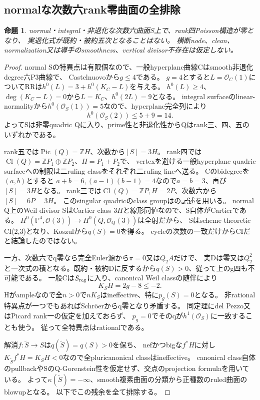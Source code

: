 \documentclass[a4paper,11pt]{ltjsarticle}
\newtheorem{proposition}{命題}[section]
\theoremstyle{definition}
\begin{document}
\subsection{normalな次数六rank零曲面の全排除}
\begin{proposition}\label{prop:normal-degree-six-rank-zero}
normal・integral・非退化な次数六曲面S上で、rank四Poisson構造が零となり、
実退化式が既約・被約五次となることはない。
横断node、clean、normalization又は導手のsmoothness、vertical divisor不存在は仮定しない。
\end{proposition}
\begin{proof}
normal Sの特異点は有限個なので、一般hyperplane曲線Cはsmooth非退化degree六P3曲線で、
Castelnuovoから$g\le4$である。
$g=4$とすると$L=\mathcal O_C(1)$についてRRは$h^0(L)=3+h^0(K_C-L)$を与える。
$h^0(L)\ge4$、$\deg(K_C-L)=0$から$L=K_C$、$h^0(2L)=9$となる。
integral surfaceのlinear-normalityから$h^0(\mathcal O_S(1))=5$なので、hyperplane完全列により
\[
 h^0(\mathcal O_S(2))\le5+9=14.
\]
よってSは非零quadric Qに入り、prime性と非退化性からQはrank三、四、五のいずれかである。

rank五では$\operatorname{Pic}(Q)=\mathbb ZH$、次数から$[S]=3H$。
rank四では$\operatorname{Cl}(Q)=\mathbb ZP_1\oplus\mathbb ZP_2$、$H=P_1+P_2$で、
vertexを避ける一般hyperplane quadric surfaceへの制限は二ruling classをそれぞれ二ruling lineへ送る。
Cのbidegreeを$(a,b)$とすると
$a+b=6,(a-1)(b-1)=4$なので$a=b=3$、再び$[S]=3H$となる。
rank三では$\operatorname{Cl}(Q)=\mathbb ZP,H=2P$、次数六から$[S]=6P=3H$。
このsingular quadricのclass groupは\cite[p.5]{tironi5}の記述を用いる。
normal Q上のWeil divisor SはCartier class $3H$と線形同値なので、S自体がCartierである。
$H^0(\mathbb P^4,\mathcal O(3))\to H^0(Q,\mathcal O_Q(3))$は全射だから、
Sはscheme-theoretic CI(2,3)となり、Koszulから$q(S)=0$を得る。
cycleの次数の一致だけからCIだと結論したのではない。

一方、次数六でq零なら完全Euler源から$\pi=0$又は$Q_2A$だけで、
実Dは零又は$Q_2^2$と一次式の積となる。既約・被約Dに反するから$q(S)>0$、従って上のg四も不可能である。
一般Cは$S_{\rm reg}$に入り、canonical Weil classの随伴により
\[
 K_SH=2g-8\le-2.
\]
Hがampleなので全$n>0$で$nK_S$はineffective、特に$p_g(S)=0$となる。
非rational特異点が一つでもあればSchr\"oer\cite[Theorem 2.2]{schroeer}からq零となり矛盾する。
同定理にdel Pezzo又はPicard rank一の仮定を加えておらず、
$p_g=0$でそのqが$h^1(\mathcal O_S)$に一致することも使う。
従って全特異点はrationalである。

解消$f:\widetilde S\to S$は$q(\widetilde S)=q(S)>0$を保ち、
nefかつbigな$f^*H$に対し$K_{\widetilde S}f^*H=K_SH<0$なので全pluricanonical classはineffective。
canonical class自体のpullbackやSのQ-Gorenstein性を仮定せず、交点のprojection formulaを用いている。
よって$\kappa(\widetilde S)=-\infty$、smooth複素曲面の分類から正種数のruled曲面のblowupとなる。
以下でこの残余を全て排除する。


\end{proof}
\end{document}
